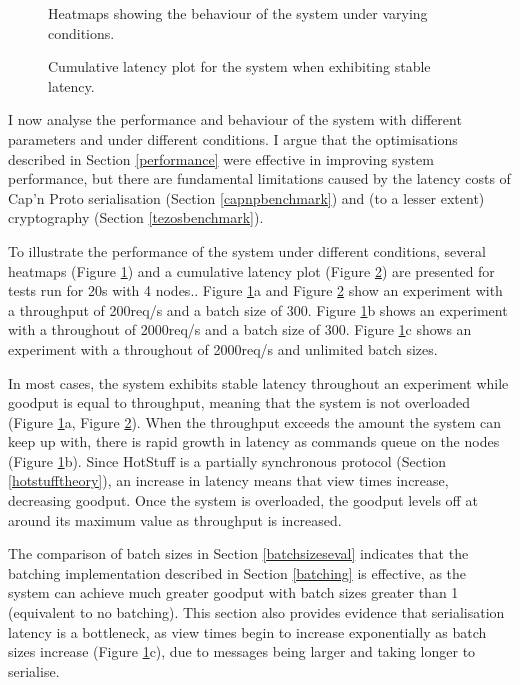 \begin{figure}[h!]
\centering
\resizebox{.8\textwidth}{!}{}
\caption{Heatmaps showing the behaviour of the system under varying conditions.}
\label{heatmaps}
\end{figure}

\begin{figure}[h!]
\centering
\resizebox{.6\textwidth}{!}{}
\caption{Cumulative latency plot for the system when exhibiting stable latency.}
\label{ecdfstable}
\end{figure}

I now analyse the performance and behaviour of the system with different parameters and under different conditions. I argue that the optimisations described in Section \ref{performance} were effective in improving system performance, but there are fundamental limitations caused by the latency costs of Cap'n Proto serialisation (Section \ref{capnpbenchmark}) and (to a lesser extent) cryptography (Section \ref{tezosbenchmark}).

To illustrate the performance of the system under different conditions, several heatmaps (Figure \ref{heatmaps}) and a cumulative latency plot (Figure \ref{ecdfstable}) are presented for tests run for 20s with 4 nodes.. Figure \ref{heatmaps}a and Figure \ref{ecdfstable} show an experiment with a throughput of 200req/s and a batch size of 300. Figure \ref{heatmaps}b shows an experiment with a throughout of 2000req/s and a batch size of 300. Figure \ref{heatmaps}c shows an experiment with a throughout of 2000req/s and unlimited batch sizes.

In most cases, the system exhibits stable latency throughout an experiment while goodput is equal to throughput, meaning that the system is not overloaded (Figure \ref{heatmaps}a, Figure \ref{ecdfstable}). When the throughput exceeds the amount the system can keep up with, there is rapid growth in latency as commands queue on the nodes (Figure \ref{heatmaps}b). Since HotStuff is a partially synchronous protocol (Section \ref{hotstufftheory}), an increase in latency means that view times increase, decreasing goodput. Once the system is overloaded, the goodput levels off at around its maximum value as throughput is increased.

The comparison of batch sizes in Section \ref{batchsizeseval} indicates that the batching implementation described in Section \ref{batching} is effective, as the system can achieve much greater goodput with batch sizes greater than 1 (equivalent to no batching). This section also provides evidence that serialisation latency is a bottleneck, as view times begin to increase exponentially as batch sizes increase (Figure \ref{heatmaps}c), due to messages being larger and taking longer to serialise.

